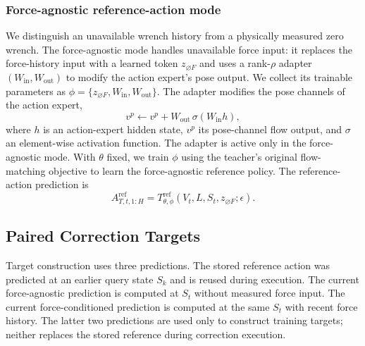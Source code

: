 \subsubsection{Force-agnostic reference-action mode}

We distinguish an unavailable wrench history from a physically measured zero wrench. The force-agnostic mode handles unavailable force input: it replaces the force-history input with a learned token $z_{\varnothing F}$ and uses a rank-$\rho$ adapter $(W_{\mathrm{in}},W_{\mathrm{out}})$ to modify the action expert's pose output. We collect its trainable parameters as $\phi=\{z_{\varnothing F},W_{\mathrm{in}},W_{\mathrm{out}}\}$. The adapter modifies the pose channels of the action expert,
\begin{equation}
    v^p\leftarrow v^p+W_{\mathrm{out}}\,
    \sigma(W_{\mathrm{in}}h),
    \label{eq:missing_force_adapter}
\end{equation}
where $h$ is an action-expert hidden state, $v^p$ its pose-channel flow output, and $\sigma$ an element-wise activation function. The adapter is active only in the force-agnostic mode. With $\theta$ fixed, we train $\phi$ using the teacher's original flow-matching objective to learn the force-agnostic reference policy.
The reference-action prediction is
\begin{equation}
    A_{T,t,1:H}^{\mathrm{ref}}
    =T_{\theta,\phi}^{\mathrm{ref}}
      (V_t,L,S_t,z_{\varnothing F};\epsilon).
    \label{eq:teacher_missing}
\end{equation}

\subsection{Paired Correction Targets}
\label{sec:distillation}

\label{sec:teacher_differencing}

Target construction uses three predictions. The stored reference action was predicted at an earlier query state $S_k$ and is reused during execution. The current force-agnostic prediction is computed at $S_t$ without measured force input. The current force-conditioned prediction is computed at the same $S_t$ with recent force history. The latter two predictions are used only to construct training targets; neither replaces the stored reference during correction execution.

